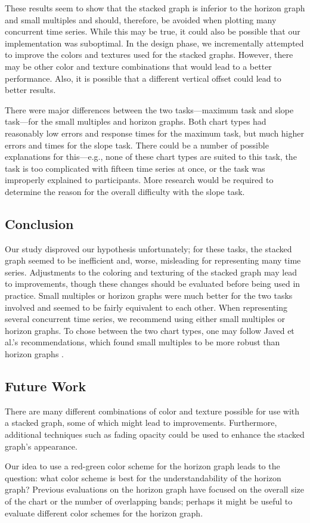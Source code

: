\documentclass{article}
\begin{document}
These results seem to show that the stacked graph is inferior to the horizon graph and small multiples and should, therefore, be avoided when plotting many concurrent time series.  While this may be true, it could also be possible that our implementation was suboptimal.  In the design phase, we incrementally attempted to improve the colors and textures used for the stacked graphs.  However, there may be other color and texture combinations that would lead to a better performance.  Also, it is possible that a different vertical offset could lead to better results.

There were major differences between the two tasks---maximum task and slope task---for the small multiples and horizon graphs.  Both chart types had reasonably low errors and response times for the maximum task, but much higher errors and times for the slope task.  There could be a number of possible explanations for this---e.g., none of these chart types are suited to this task, the task is too complicated with fifteen time series at once, or the task was improperly explained to participants.  More research would be required to determine the reason for the overall difficulty with the slope task.

\subsection{Conclusion}

Our study disproved our hypothesis unfortunately; for these tasks, the stacked graph seemed to be inefficient and, worse, misleading for representing many time series.  Adjustments to the coloring and texturing of the stacked graph may lead to improvements, though these changes should be evaluated before being used in practice.  Small multiples or horizon graphs were much better for the two tasks involved and seemed to be fairly equivalent to each other.  When representing several concurrent time series, we recommend using either small multiples or horizon graphs.  To chose between the two chart types, one may follow Javed et al.'s recommendations, which found small multiples to be more robust than horizon graphs \cite{javed2010}.  
\subsection{Future Work}

There are many different combinations of color and texture possible for use with a stacked graph, some of which might lead to improvements.  Furthermore, additional techniques such as fading opacity could be used to enhance the stacked graph's appearance.

Our idea to use a red-green color scheme for the horizon graph leads to the question: what color scheme is best for the understandability of the horizon graph?  Previous evaluations on the horizon graph have focused on the overall size of the chart or the number of overlapping bands; perhaps it might be useful to evaluate different color schemes for the horizon graph.




\end{document}
